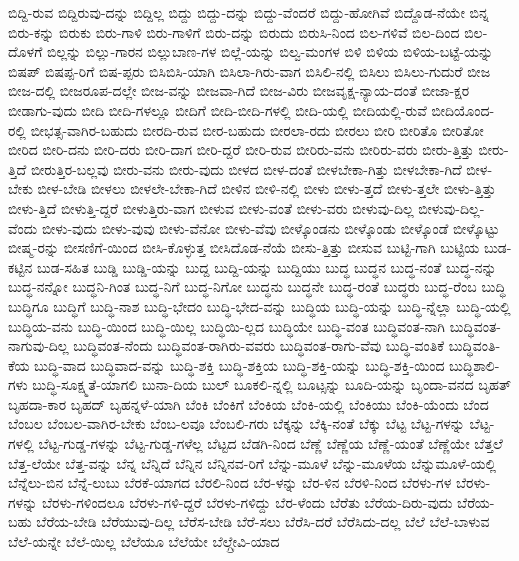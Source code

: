 {ಬಿದ್ದಿ-ರುವ
ಬಿದ್ದಿರುವು-ದನ್ನು
ಬಿದ್ದಿಲ್ಲ
ಬಿದ್ದು
ಬಿದ್ದು-ದನ್ನು
ಬಿದ್ದು-ವೆಂದರೆ
ಬಿದ್ದು-ಹೋಗಿವೆ
ಬಿದ್ದೊಡ-ನೆಯೇ
ಬಿನ್ನ
ಬಿರು-ಕನ್ನು
ಬಿರುಕು
ಬಿರು-ಗಾಳಿ
ಬಿರು-ಗಾಳಿಗೆ
ಬಿರು-ದನ್ನು
ಬಿರುದು
ಬಿರುಸಿ-ನಿಂದ
ಬಿಲ-ಗಳಿವೆ
ಬಿಲ-ದಿಂದ
ಬಿಲ-ದೊಳಗೆ
ಬಿಲ್ಲನ್ನು
ಬಿಲ್ಲು-ಗಾರನ
ಬಿಲ್ಲುಬಾಣ-ಗಳ
ಬಿಲ್ಲೆ-ಯನ್ನು
ಬಿಲ್ವ-ಮಂಗಳ
ಬಿಳಿ
ಬಿಳಿಯ
ಬಿಳಿಯ-ಬಟ್ಟೆ-ಯನ್ನು
ಬಿಷಪ್
ಬಿಷಪ್ಪ-ರಿಗೆ
ಬಿಷ-ಪ್ಪರು
ಬಿಸಿಬಿಸಿ-ಯಾಗಿ
ಬಿಸಿಲಾ-ಗಿರು-ವಾಗ
ಬಿಸಿಲಿ-ನಲ್ಲಿ
ಬಿಸಿಲು
ಬಿಸಿಲು-ಗುದುರೆ
ಬೀಜ
ಬೀಜ-ದಲ್ಲಿ
ಬೀಜರೂಪ-ದಲ್ಲೇ
ಬೀಜ-ವನ್ನು
ಬೀಜವಾ-ಗಿದೆ
ಬೀಜ-ವಿರು
ಬೀಜವೃಕ್ಷ-ನ್ಯಾಯ-ದಂತೆ
ಬೀಜಾ-ಕ್ಷರ
ಬೀಡಾಗು-ವುದು
ಬೀದಿ
ಬೀದಿ-ಗಳಲ್ಲೂ
ಬೀದಿಗೆ
ಬೀದಿ-ಬೀದಿ-ಗಳಲ್ಲಿ
ಬೀದಿ-ಯಲ್ಲಿ
ಬೀದಿಯಲ್ಲಿ-ರುವೆ
ಬೀದಿಯೊಂದ-ರಲ್ಲಿ
ಬೀಭತ್ಸ-ವಾಗಿರ-ಬಹುದು
ಬೀರದಿ-ರುವ
ಬೀರ-ಬಹುದು
ಬೀರಲಾ-ರದು
ಬೀರಲು
ಬೀರಿ
ಬೀರಿತೊ
ಬೀರಿತೋ
ಬೀರಿದ
ಬೀರಿ-ದನು
ಬೀರಿ-ದರು
ಬೀರಿ-ದಾಗ
ಬೀರಿ-ದ್ದರೆ
ಬೀರಿ-ರುವ
ಬೀರಿರು-ವನು
ಬೀರಿರು-ವರು
ಬೀರು-ತ್ತಿತ್ತು
ಬೀರು-ತ್ತಿದೆ
ಬೀರುತ್ತಿರ-ಬಲ್ಲವು
ಬೀರು-ವನು
ಬೀರು-ವುದು
ಬೀಳದ
ಬೀಳ-ದಂತೆ
ಬೀಳಬೇಕಾ-ಗಿತ್ತು
ಬೀಳಬೇಕಾ-ಗಿದೆ
ಬೀಳ-ಬೇಕು
ಬೀಳ-ಬೇಡಿ
ಬೀಳಲು
ಬೀಳಲೇ-ಬೇಕಾ-ಗಿದೆ
ಬೀಳಿನ
ಬೀಳಿ-ನಲ್ಲಿ
ಬೀಳು
ಬೀಳು-ತ್ತದೆ
ಬೀಳು-ತ್ತಲೇ
ಬೀಳು-ತ್ತಿತ್ತು
ಬೀಳು-ತ್ತಿದೆ
ಬೀಳುತ್ತಿ-ದ್ದರೆ
ಬೀಳುತ್ತಿರು-ವಾಗ
ಬೀಳುವ
ಬೀಳು-ವಂತೆ
ಬೀಳು-ವರು
ಬೀಳುವು-ದಿಲ್ಲ
ಬೀಳುವು-ದಿಲ್ಲ-ವೆಂದು
ಬೀಳು-ವುದು
ಬೀಳು-ವುವು
ಬೀಳು-ವೆನೋ
ಬೀಳು-ವೆವು
ಬೀಳ್ಕೊಂಡನು
ಬೀಳ್ಕೊಂಡು
ಬೀಳ್ಕೊಂಡೆ
ಬೀಳ್ಕೊಟ್ಟು
ಬೀಷ್ಮ-ರನ್ನು
ಬೀಸಣಿಗೆ-ಯಿಂದ
ಬೀಸಿ-ಕೊಳ್ಳುತ್ತ
ಬೀಸಿದೊಡ-ನೆಯೆ
ಬೀಸು-ತ್ತಿತ್ತು
ಬೀಸುವ
ಬುಟ್ಟಿ-ಗಾಗಿ
ಬುಟ್ಟಿಯ
ಬುಡ-ಕಟ್ಟಿನ
ಬುಡ-ಸಹಿತ
ಬುಡ್ಡಿ
ಬುಡ್ಡಿ-ಯನ್ನು
ಬುದ್ದ
ಬುದ್ದಿ-ಯನ್ನು
ಬುದ್ದಿಯು
ಬುದ್ಧ
ಬುದ್ಧನ
ಬುದ್ಧ-ನಂತೆ
ಬುದ್ಧ-ನನ್ನು
ಬುದ್ಧ-ನನ್ನೋ
ಬುದ್ಧನಿ-ಗಿಂತ
ಬುದ್ಧ-ನಿಗೆ
ಬುದ್ಧ-ನಿಗೋ
ಬುದ್ಧನು
ಬುದ್ಧನೇ
ಬುದ್ಧ-ರಂತೆ
ಬುದ್ಧರು
ಬುದ್ಧ-ರೆಂಬ
ಬುದ್ಧಿ
ಬುದ್ಧಿಗೂ
ಬುದ್ಧಿಗೆ
ಬುದ್ಧಿ-ನಾಶ
ಬುದ್ಧಿ-ಭೇದಂ
ಬುದ್ಧಿ-ಭೇದ-ವನ್ನು
ಬುದ್ಧಿಯ
ಬುದ್ಧಿ-ಯನ್ನು
ಬುದ್ಧಿ-ನ್ನೆಲ್ಲಾ
ಬುದ್ಧಿ-ಯಲ್ಲಿ
ಬುದ್ಧಿಯ-ವನು
ಬುದ್ಧಿ-ಯಿಂದ
ಬುದ್ಧಿ-ಯಿಲ್ಲ
ಬುದ್ಧಿಯಿ-ಲ್ಲದ
ಬುದ್ಧಿಯೇ
ಬುದ್ಧಿ-ವಂತ
ಬುದ್ಧಿವಂತ-ನಾಗಿ
ಬುದ್ಧಿವಂತ-ನಾಗುವು-ದಿಲ್ಲ
ಬುದ್ಧಿವಂತ-ನೆಂದು
ಬುದ್ಧಿವಂತ-ರಾಗಿರು-ವವರು
ಬುದ್ಧಿವಂತ-ರಾಗು-ವೆವು
ಬುದ್ಧಿ-ವಂತಿಕೆ
ಬುದ್ಧಿವಂತಿ-ಕೆಯ
ಬುದ್ಧಿ-ವಾದ
ಬುದ್ಧಿವಾದ-ವನ್ನು
ಬುದ್ಧಿ-ಶಕ್ತಿ
ಬುದ್ಧಿ-ಶಕ್ತಿಯ
ಬುದ್ಧಿ-ಶಕ್ತಿ-ಯನ್ನು
ಬುದ್ಧಿ-ಶಕ್ತಿ-ಯಿಂದ
ಬುದ್ಧಿಶಾಲಿ-ಗಳು
ಬುದ್ಧಿ-ಸೂಕ್ಷ್ಮತೆ-ಯಾಗಲಿ
ಬುನಾ-ದಿಯ
ಬುಲ್
ಬೂಕಲಿ-ನ್ನಲ್ಲಿ
ಬೂಟ್ಸನ್ನು
ಬೂದಿ-ಯನ್ನು
ಬೃಂದಾ-ವನದ
ಬೃಹತ್
ಬೃಹದಾ-ಕಾರ
ಬೃಹದ್
ಬೃಹನ್ನಳೆ-ಯಾಗಿ
ಬೆಂಕಿ
ಬೆಂಕಿಗೆ
ಬೆಂಕಿಯ
ಬೆಂಕಿ-ಯಲ್ಲಿ
ಬೆಂಕಿಯು
ಬೆಂಕಿ-ಯೆಂದು
ಬೆಂದ
ಬೆಂಬಲ
ಬೆಂಬಲ-ವಾಗಿರ-ಬೇಕು
ಬೆಂಬ-ಲವೂ
ಬೆಂಬಲಿ-ಗರು
ಬೆಕ್ಕನ್ನು
ಬೆಕ್ಕಿ-ನಂತೆ
ಬೆಕ್ಕು
ಬೆಟ್ಟ
ಬೆಟ್ಟ-ಗಳನ್ನು
ಬೆಟ್ಟ-ಗಳಲ್ಲಿ
ಬೆಟ್ಟ-ಗುಡ್ಡ-ಗಳನ್ನು
ಬೆಟ್ಟ-ಗುಡ್ಡ-ಗಳೆಲ್ಲ
ಬೆಟ್ಟದ
ಬೆಡಗಿ-ನಿಂದ
ಬೆಣ್ಣೆ
ಬೆಣ್ಣೆಯ
ಬೆಣ್ಣೆ-ಯಂತೆ
ಬೆಣ್ಣೆಯೇ
ಬೆತ್ತಲೆ
ಬೆತ್ತ-ಲೆಯೇ
ಬೆತ್ತ-ವನ್ನು
ಬೆನ್ನ
ಬೆನ್ನಿದೆ
ಬೆನ್ನಿನ
ಬೆನ್ನಿನವ-ರಿಗೆ
ಬೆನ್ನು-ಮೂಳೆ
ಬೆನ್ನು-ಮೂಳೆಯ
ಬೆನ್ನುಮೂಳೆ-ಯಲ್ಲಿ
ಬೆನ್ನೆಲು-ಬಿನ
ಬೆನ್ನೆ-ಲುಬು
ಬೆರಕೆ-ಯಾಗದ
ಬೆರಲಿ-ನಿಂದ
ಬೆರ-ಳನ್ನು
ಬೆರ-ಳಿನ
ಬೆರಳಿ-ನಿಂದ
ಬೆರಳು-ಗಳ
ಬೆರಳು-ಗಳನ್ನು
ಬೆರಳು-ಗಳಿಂದಲೂ
ಬೆರಳು-ಗಳಿ-ದ್ದರೆ
ಬೆರಳು-ಗಳಿದ್ದು
ಬೆರ-ಳೆಂದು
ಬೆರೆತು
ಬೆರೆಯ-ದಿರು-ವುದು
ಬೆರೆಯ-ಬಹು
ಬೆರೆಯ-ಬೇಡಿ
ಬೆರೆಯುವು-ದಿಲ್ಲ
ಬೆರೆಸ-ಬೇಡಿ
ಬೆರೆ-ಸಲು
ಬೆರೆಸಿ-ದರೆ
ಬೆರೆಸಿದು-ದಲ್ಲ
ಬೆಲೆ
ಬೆಲೆ-ಬಾಳುವ
ಬೆಲೆ-ಯನ್ನೇ
ಬೆಲೆ-ಯಿಲ್ಲ
ಬೆಲೆಯೂ
ಬೆಲೆಯೇ
ಬೆಲ್ಗ್ರೇವಿ-ಯಾದ
}
